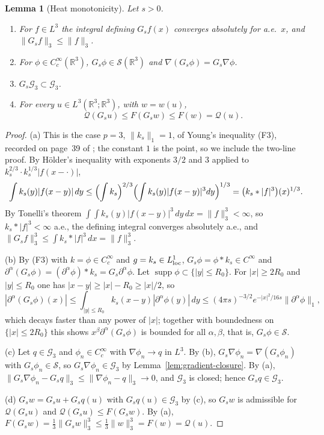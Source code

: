 \documentclass[11pt]{article}
\newtheorem{lemma}[theorem]{Lemma}
\theoremstyle{definition}
\theoremstyle{plain}
\newcommand{\R}{\mathbb R}
\newcommand{\norm}[1]{\lVert #1\rVert}
\begin{document}
\begin{lemma}[Heat monotonicity]\label{lem:quotient-heat}
Let $s>0$.
\begin{enumerate}
\item[(a)] For $f\in L^3$ the integral defining $G_sf(x)$ converges
 absolutely for a.e.\ $x$, and $\norm{G_sf}_3\le\norm f_3$.
\item[(b)] For $\phi\in C_c^\infty(\R^3)$, $G_s\phi\in\mathcal S(\R^3)$ and
 $\nabla(G_s\phi)=G_s\nabla\phi$.
\item[(c)] $G_s\mathcal G_3\subset\mathcal G_3$.
\item[(d)] For every $u\in L^3(\R^3;\R^3)$, with $w=w(u)$,
 \begin{equation}\label{eq:cp-heat}
  \mathcal Q(G_su)\le F(G_sw)\le F(w)=\mathcal Q(u).
 \end{equation}
\end{enumerate}
\end{lemma}

\begin{proof}
(a) This is the case $p=3$, $\norm{k_s}_1=1$, of Young's inequality (F3),
recorded on page~39 of \cite{Tao2013}; the constant $1$ is the point, so
we include the two-line proof.  By H\"older's inequality with exponents
$3/2$ and $3$ applied to $k_s^{2/3}\cdot k_s^{1/3}|f(x-\cdot)|$,
\[
 \int k_s(y)|f(x-y)|\,dy
 \le\Bigl(\int k_s\Bigr)^{2/3}\Bigl(\int k_s(y)|f(x-y)|^3dy\Bigr)^{1/3}
 =\bigl(k_s*|f|^3\bigr)(x)^{1/3}.
\]
By Tonelli's theorem $\int\!\!\int k_s(y)|f(x-y)|^3\,dy\,dx=\norm f_3^3<\infty$,
so $k_s*|f|^3<\infty$ a.e., the defining integral converges absolutely
a.e., and $\norm{G_sf}_3^3\le\int k_s*|f|^3\,dx=\norm f_3^3$.

(b) By (F3) with $k=\phi\in C_c^\infty$ and $g=k_s\in L^1_{\rm loc}$,
$G_s\phi=\phi*k_s\in C^\infty$ and
$\partial^\alpha(G_s\phi)=(\partial^\alpha\phi)*k_s=G_s\partial^\alpha\phi$.
Let $\operatorname{supp}\phi\subset\{|y|\le R_0\}$.  For $|x|\ge2R_0$
and $|y|\le R_0$ one has $|x-y|\ge|x|-R_0\ge|x|/2$, so
\[
 |\partial^\alpha(G_s\phi)(x)|
 \le\int_{|y|\le R_0}k_s(x-y)|\partial^\alpha\phi(y)|\,dy
 \le(4\pi s)^{-3/2}e^{-|x|^2/16s}\norm{\partial^\alpha\phi}_1 ,
\]
which decays faster than any power of $|x|$; together with boundedness on
$\{|x|\le2R_0\}$ this shows $x^\beta\partial^\alpha(G_s\phi)$ is bounded
for all $\alpha,\beta$, that is, $G_s\phi\in\mathcal S$.

(c) Let $q\in\mathcal G_3$ and $\phi_n\in C_c^\infty$ with
$\nabla\phi_n\to q$ in $L^3$.  By (b), $G_s\nabla\phi_n=\nabla(G_s\phi_n)$
with $G_s\phi_n\in\mathcal S$, so $G_s\nabla\phi_n\in\mathcal G_3$ by
Lemma~\ref{lem:gradient-closure}.  By (a),
$\norm{G_s\nabla\phi_n-G_sq}_3\le\norm{\nabla\phi_n-q}_3\to0$, and
$\mathcal G_3$ is closed; hence $G_sq\in\mathcal G_3$.

(d) $G_sw=G_su+G_sq(u)$ with $G_sq(u)\in\mathcal G_3$ by (c), so $G_sw$
is admissible for $\mathcal Q(G_su)$ and $\mathcal Q(G_su)\le F(G_sw)$.
By (a), $F(G_sw)=\frac13\norm{G_sw}_3^3\le\frac13\norm w_3^3=F(w)=\mathcal Q(u)$.
\end{proof}
\end{document}
